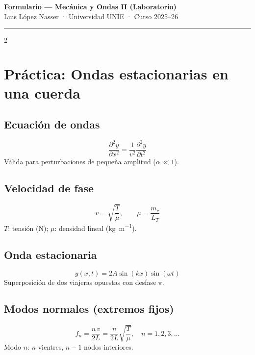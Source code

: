 \documentclass[10pt,a4paper]{article}
\begin{document}
\begin{center}
  {\large\textbf{Formulario — Mecánica y Ondas II (Laboratorio)}}\\[2pt]
  {\small Luis López Nasser · Universidad UNIE · Curso 2025--26}
\end{center}

\hrule\vspace{6pt}

\begin{multicols}{2}

\section*{Práctica: Ondas estacionarias en una cuerda}

\subsection*{Ecuación de ondas}
\begin{equation*}
  \frac{\partial^2 y}{\partial x^2} = \frac{1}{v^2}\frac{\partial^2 y}{\partial t^2}
\end{equation*}
Válida para perturbaciones de pequeña amplitud ($\alpha \ll 1$).

\subsection*{Velocidad de fase}
\begin{equation*}
  v = \sqrt{\frac{T}{\mu}}, \qquad \mu = \frac{m_c}{L_T}
\end{equation*}
$T$: tensión (N); $\mu$: densidad lineal (\si{\kg\per\m}).

\subsection*{Onda estacionaria}
\begin{equation*}
  y(x,t) = 2A\sin(kx)\sin(\omega t)
\end{equation*}
Superposición de dos viajeras opuestas con desfase $\pi$.

\subsection*{Modos normales (extremos fijos)}
\begin{equation*}
  \boxed{f_n = \frac{n\,v}{2L} = \frac{n}{2L}\sqrt{\frac{T}{\mu}}}, \quad n = 1,2,3,\ldots
\end{equation*}
Modo $n$: $n$ vientres, $n-1$ nodos interiores.


\end{multicols}
\end{document}
